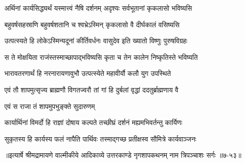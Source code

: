 \twolineshloka
{अर्थिनां कार्यसिद्ध्यर्थं यस्मात्त्वं नैषि दर्शनम्}
{अदृश्यः सर्वभूतानां कृकलासो भविष्यसि} %

\twolineshloka
{बहुवर्षसहस्राणि बहुवर्षशतानि च}
{श्वभ्रेऽस्मिन् कृकलासो वै दीर्घकालं वसिष्यसि} %

\twolineshloka
{उत्पत्स्यते हि लोकेऽस्मिन्यदूनां कीर्तिवर्धनः}
{वासुदेव इति ख्यातो विष्णुः पुरुषविग्रहः} %

\twolineshloka
{स ते मोक्षयिता राजंस्तस्माच्छापाद्भविष्यसि}
{कृता च तेन कालेन निष्कृतिस्ते भविष्यति} %

\twolineshloka
{भारावतरणार्थं हि नरनारायणावुभौ}
{उत्पत्स्येते महावीर्यौ कलौ युग उपस्थिते} %

\twolineshloka
{एवं तौ शापमुत्सृज्य ब्राह्मणौ विगतज्वरौ}
{तां गां हि दुर्बलां वृद्धां ददतुर्ब्राह्मणाय वै} %

\onelineshloka
{एवं स राजा तं शापमुपभुङ्क्ते सुदारुणम्} %

\twolineshloka
{कार्यार्थिनां विमर्दो हि राज्ञां दोषाय कल्पते}
{तच्छीघ्रं दर्शनं मह्यमभिवर्तन्तु कार्यिणः} %

\twolineshloka
{सुकृतस्य हि कार्यस्य फलं नापैति पार्थिवः}
{तस्माद्गच्छ प्रतीक्षस्व सौमित्रे कार्यवाञ्जनः} %


॥इत्यार्षे श्रीमद्रामायणे वाल्मीकीये आदिकाव्ये उत्तरकाण्डे नृगशापकथनम् नाम त्रिपञ्चाशः सर्गः ॥७-५३॥
